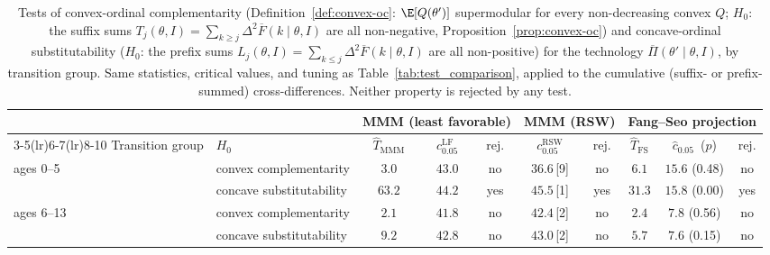 \begin{table}[htbp]
\centering\small
\begin{tabular}{@{}llcccccccc@{}}
\toprule
 & & \multicolumn{3}{c}{MMM (least favorable)} & \multicolumn{2}{c}{MMM (RSW)} & \multicolumn{3}{c}{Fang--Seo projection} \\
\cmidrule(lr){3-5}\cmidrule(lr){6-7}\cmidrule(lr){8-10}
Transition group & $H_0$ & $\hat T_{\mathrm{MMM}}$ & $c^{\mathrm{LF}}_{0.05}$ & rej. & $c^{\mathrm{RSW}}_{0.05}$ & rej. & $\hat T_{\mathrm{FS}}$ & $\hat c_{0.05}$ \,($p$) & rej. \\ \midrule
ages 0--5 & convex complementarity & $3.0$ & $43.0$ & no & $36.6$\,[9] & no & $6.1$ & $15.6$ (0.48) & no \\
 & concave substitutability & $63.2$ & $44.2$ & yes & $45.5$\,[1] & yes & $31.3$ & $15.8$ (0.00) & yes \\
\midrule
ages 6--13 & convex complementarity & $2.1$ & $41.8$ & no & $42.4$\,[2] & no & $2.4$ & $7.8$ (0.56) & no \\
 & concave substitutability & $9.2$ & $42.8$ & no & $43.0$\,[2] & no & $5.7$ & $7.6$ (0.15) & no \\
\bottomrule
\end{tabular}
\caption{Tests of convex-ordinal complementarity (Definition~\ref{def:convex-oc}: $\E[Q(\theta')]$
supermodular for every non-decreasing convex $Q$; $H_0$: the suffix sums
$T_j(\theta,I)=\sum_{k\geq j}\Delta^2\overline F(k\mid\theta,I)$ are all non-negative,
Proposition~\ref{prop:convex-oc}) and concave-ordinal substitutability ($H_0$: the prefix
sums $L_j(\theta,I)=\sum_{k\leq j}\Delta^2\overline F(k\mid\theta,I)$ are all
non-positive) for the technology $\overline\Pi(\theta'\mid\theta,I)$, by transition
group. Same statistics, critical values, and tuning as Table~\ref{tab:test_comparison},
applied to the cumulative (suffix- or prefix-summed) cross-differences. Neither property is
rejected by any test.}
\label{tab:shape}
\end{table}
